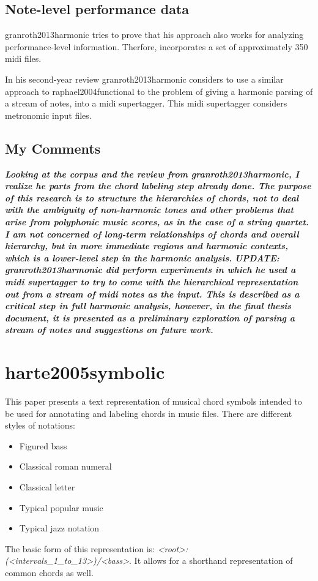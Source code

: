 		\subsection{Note-level performance data}
			granroth2013harmonic tries to prove that his approach also works for analyzing performance-level information. Therfore, incorporates a set of approximately 350 midi files.

			In his second-year review granroth2013harmonic considers to use a similar approach to raphael2004functional to the problem of giving a harmonic parsing of a stream of notes, into a midi supertagger. This midi supertagger considers metronomic input files.

		\subsection{My Comments}
			\emph{\textbf{Looking at the corpus and the review from granroth2013harmonic, I realize he parts from the chord labeling step already done. The purpose of this research is to structure the hierarchies of chords, not to deal with the ambiguity of non-harmonic tones and other problems that arise from polyphonic music scores, as in the case of a string quartet. I am not concerned of long-term relationships of chords and overall hierarchy, but in more immediate regions and harmonic contexts, which is a lower-level step in the harmonic analysis.
			}}
			\emph{\textbf{UPDATE: granroth2013harmonic did perform experiments in which he used a midi supertagger to try to come with the hierarchical representation out from a stream of midi notes as the input. This is described as a critical step in full harmonic analysis, however, in the final thesis document, it is presented as a preliminary exploration of parsing a stream of notes and suggestions on future work.}}

	\section{harte2005symbolic }
		This paper presents a text representation of musical chord symbols intended to be used for annotating and labeling chords in music files.
		There are different styles of notations:
		\begin{itemize}
			\item Figured bass
			\item Classical roman numeral
			\item Classical letter
			\item Typical popular music
			\item Typical jazz notation
		\end{itemize}
		The basic form of this representation is: \emph{<root>:(<intervals_1_to_13>)/<bass>}. It allows for a shorthand representation of common chords as well.
